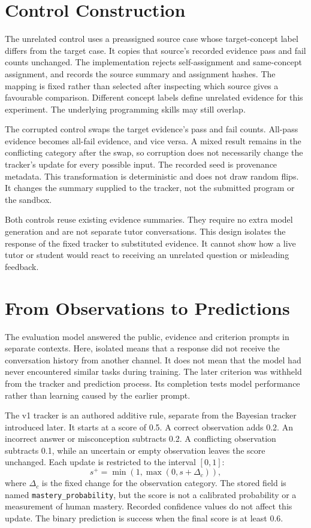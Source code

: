 \section{Control Construction}

The unrelated control uses a preassigned source case whose target-concept label differs from the target case. It copies that
source's recorded evidence pass and fail counts unchanged. The implementation rejects self-assignment and same-concept
assignment, and records the source summary and assignment hashes. The mapping is fixed rather than selected after inspecting
which source gives a favourable comparison. Different concept labels define unrelated evidence for this experiment.
The underlying programming skills may still overlap.

The corrupted control swaps the target evidence's pass and fail counts. All-pass evidence becomes all-fail evidence, and
vice versa. A mixed result remains in the conflicting category after the swap, so corruption does not necessarily change
the tracker's update for every possible input. The recorded seed is provenance metadata. This transformation is deterministic
and does not draw random flips. It changes the summary supplied to the tracker, not the submitted program or the sandbox.

Both controls reuse existing evidence summaries. They require no extra model generation and are not separate tutor
conversations. This design isolates the response of the fixed tracker to substituted evidence. It cannot show how a live
tutor or student would react to receiving an unrelated question or misleading feedback.

\section{From Observations to Predictions}

The evaluation model answered the public, evidence and criterion prompts in separate contexts. Here, isolated means that a
response did not receive the conversation history from another channel. It does not mean that the model had never encountered
similar tasks during training. The later criterion was withheld from the tracker and prediction process. Its completion tests
model performance rather than learning caused by the earlier prompt.

The v1 tracker is an authored additive rule, separate from the Bayesian tracker introduced later. It starts at a score of 0.5.
A correct observation adds 0.2. An incorrect answer or misconception subtracts 0.2. A conflicting observation subtracts 0.1,
while an uncertain or empty observation leaves the score unchanged. Each update is restricted to the interval $[0,1]$:
\begin{equation}
  s^{+}=\min(1,\max(0,s+\Delta_c)),
\end{equation}
where $\Delta_c$ is the fixed change for the observation category. The stored field is named
\texttt{mastery\_probability}, but the score is not a calibrated probability or a measurement of human mastery. Recorded
confidence values do not affect this update. The binary prediction is success when the final score is at least 0.6.

